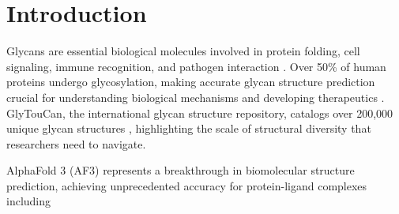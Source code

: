 \documentclass[11pt,a4paper]{article}
\begin{document}
\section{Introduction}

Glycans are essential biological molecules involved in protein folding, cell signaling, immune recognition, and pathogen interaction \citep{varki2017}. Over 50\% of human proteins undergo glycosylation, making accurate glycan structure prediction crucial for understanding biological mechanisms and developing therapeutics \citep{helenius2004}. GlyTouCan, the international glycan structure repository, catalogs over 200,000 unique glycan structures \citep{tiemeyer2016}, highlighting the scale of structural diversity that researchers need to navigate.

AlphaFold 3 (AF3) represents a breakthrough in biomolecular structure prediction, achieving unprecedented accuracy for protein-ligand complexes including
\end{document}
